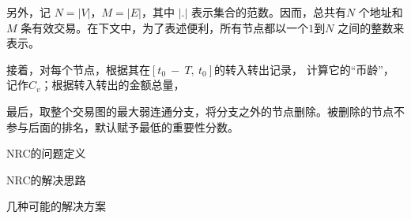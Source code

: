另外，记 $N = |V|$，$M = |E|$，其中 $|.|$ 表示集合的范数。因而，总共有$N$ 个地址和$M$ 条有效交易。在下文中，为了表述便利，所有节点都以一个$1$到$N$ 之间的整数来表示。

接着，对每个节点，根据其在$[t_0\ −\ T,\ t_0]$的转入转出记录，
计算它的“币龄”，记作$C_v$；根据转入转出的金额总量，


最后，取整个交易图的最大弱连通分支，将分支之外的节点删除。被删除的节点不参与后面的排名，默认赋予最低的重要性分数。



NRC的问题定义

NRC的解决思路

几种可能的解决方案
